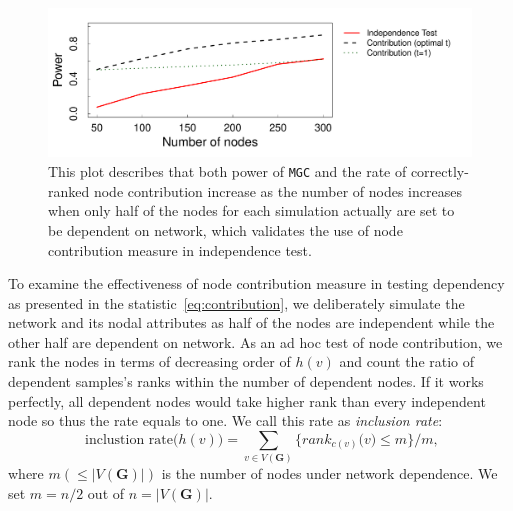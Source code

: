 \documentclass[11pt]{article}
\theoremstyle{definition}
\begin{document}

\begin{figure}[ht]
	\centering
	\includegraphics[width=\linewidth]{nodecontri2.pdf}
	\caption{This plot describes that both power of \texttt{MGC} and the rate of correctly-ranked node contribution increase as the number of nodes increases when only half of the nodes for each simulation actually are set to be dependent on network, which validates the use of node contribution measure in independence test.}
	\label{fig:contribution}
\end{figure}
To examine the effectiveness of node contribution measure in testing dependency as presented in the statistic~\ref{eq:contribution}, we deliberately simulate the network and its nodal attributes as half of the nodes are independent while the other half are dependent on network. As an ad hoc test of node contribution, we rank the nodes in terms of decreasing order of $h(v)$ and count the ratio of dependent samples's ranks within the number of dependent nodes. If it works perfectly, all dependent nodes would take higher rank than every independent node so thus the rate equals to one. We call this rate as \textit{inclusion rate}:
\begin{equation}
\mbox{ inclustion rate}\big(  h(v) \big) = \sum\limits_{v \in V(\mathbf{G})} \big\{  rank_{c(v)}\big(  v \big)  \leq  m  \big\}   /  m,
\label{eq:inclusion_rate}
\end{equation}
where $m (\leq |V(\mathbf{G})|)$ is the number of nodes under network dependence. We set $m=n/2$ out of $n = |V(\mathbf{G})|$.
\end{document}
